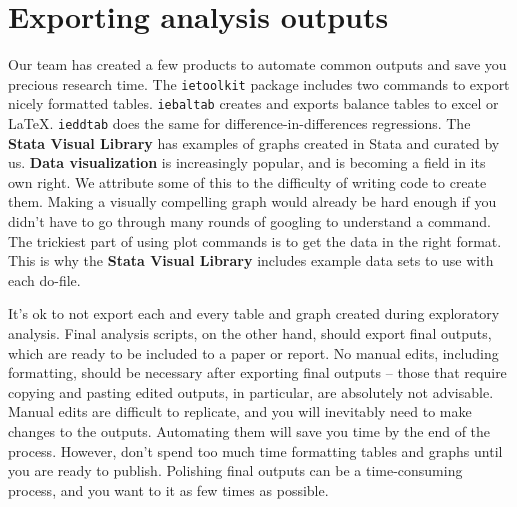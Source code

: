 \section{Exporting analysis outputs}

Our team has created a few products to automate common outputs and save you 
precious research time.
The \texttt{ietoolkit} package includes two commands to export nicely formatted tables.
\texttt{iebaltab} creates and exports balance tables to excel or {\LaTeX}. 
\texttt{ieddtab} does the same for difference-in-differences regressions.
The \textbf{Stata Visual Library}
has examples of graphs created in Stata and curated by us.
\textbf{Data visualization} 
is increasingly popular, and is becoming a field in its own right.\cite{healy2018data,wilke2019fundamentals}
We attribute some of this to the difficulty of writing code to create them.
Making a visually compelling graph would already be hard enough if you didn't have to go through many rounds of googling to understand a command.
The trickiest part of using plot commands is to get the data in the right format.
This is why the \textbf{Stata Visual Library} includes example data sets to use 
with each do-file.

It's ok to not export each and every table and graph created during exploratory analysis. 
Final analysis scripts, on the other hand, should export final outputs, which are ready to be included to a paper or report.
No manual edits, including formatting, should be necessary after exporting final outputs -- 
those that require copying and pasting edited outputs, in particular, are absolutely not advisable. 
Manual edits are difficult to replicate, and you will inevitably need to make changes to the outputs. 
Automating them will save you time by the end of the process. 
However, don't spend too much time formatting tables and graphs until you are ready to publish.
Polishing final outputs can be a time-consuming process, 
and you want to it as few times as possible.

